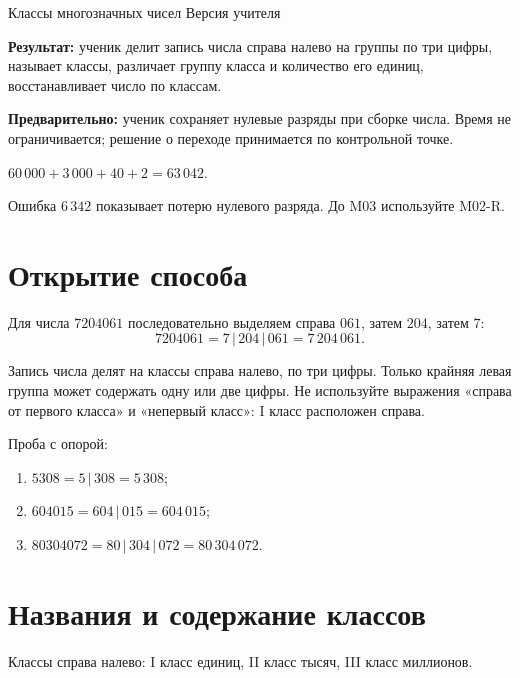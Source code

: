 \worksheettitle
  {Классы многозначных чисел}
  { Версия учителя}

\begin{teacherbox}
  \textbf{Результат:} ученик делит запись числа справа налево на группы по три
  цифры, называет классы, различает группу класса и количество его единиц,
  восстанавливает число по классам.

  \textbf{Предварительно:} ученик сохраняет нулевые разряды при сборке числа.
  Время не ограничивается; решение о переходе принимается по контрольной точке.
\end{teacherbox}

\begin{checkpointbox}
  \(60\,000+3\,000+40+2=63\,042.\)

  Ошибка \(6\,342\) показывает потерю нулевого разряда. До M03 используйте
  M02-R.
\end{checkpointbox}

\section{Открытие способа}

Для числа \(7204061\) последовательно выделяем справа \(061\), затем \(204\),
затем \(7\):
\[
  7204061=7\,|\,204\,|\,061=7\,204\,061.
\]

\begin{teacherbox}
  Запись числа делят на классы справа налево, по три цифры. Только крайняя
  левая группа может содержать одну или две цифры. Не используйте выражения
  «справа от первого класса» и «непервый класс»: I класс расположен справа.
\end{teacherbox}

Проба с опорой:
\begin{enumerate}
  \item \(5308=5\,|\,308=5\,308\);
  \item \(604015=604\,|\,015=604\,015\);
  \item \(80304072=80\,|\,304\,|\,072=80\,304\,072\).
\end{enumerate}

\section{Названия и содержание классов}

Классы справа налево: I класс единиц, II класс тысяч, III класс миллионов.


